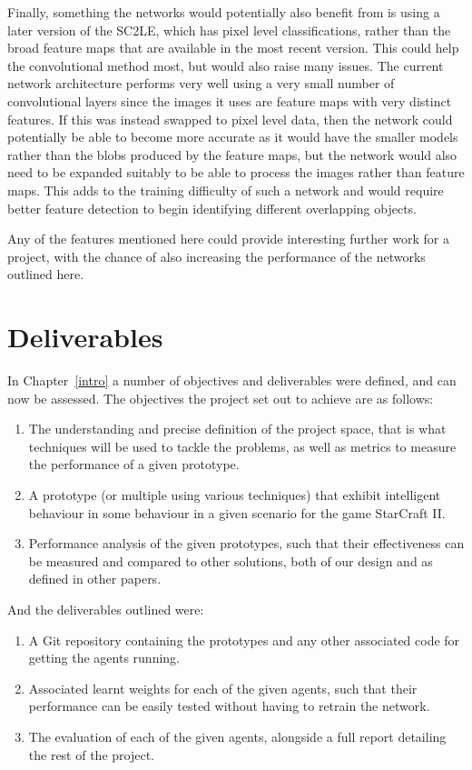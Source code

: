 Finally, something the networks would potentially also benefit from is using a
later version of the SC2LE, which has pixel level classifications, rather than
the broad feature maps that are available in the most recent version. This could
help the convolutional method most, but would also raise many issues. The
current network architecture performs very well using a very small number of
convolutional layers since the images it uses are feature maps with very
distinct features. If this was instead swapped to pixel level data, then the
network could potentially be able to become more accurate as it would have the
smaller models rather than the blobs produced by the feature maps, but the
network would also need to be expanded suitably to be able to process the images
rather than feature maps. This adds to the training difficulty of such a network
and would require better feature detection to begin identifying different
overlapping objects.

Any of the features mentioned here could provide interesting further work for
a project, with the chance of also increasing the performance of the networks
outlined here.

\section{Deliverables}

In Chapter~\ref{intro} a number of objectives and deliverables were defined, and
can now be assessed. The objectives the project set out to achieve are as
follows:

\begin{enumerate}
    \item The understanding and precise definition of the project space, that is
        what techniques will be used to tackle the problems, as well as metrics
        to measure the performance of a given prototype.
    \item A prototype (or multiple using various techniques) that exhibit
        intelligent behaviour in some behaviour in a given scenario for
        the game StarCraft II\@.
    \item Performance analysis of the given prototypes, such that their
        effectiveness can be measured and compared to other solutions, both of
        our design and as defined in other papers.
\end{enumerate}

And the deliverables outlined were:

\begin{enumerate}
    \item A Git repository containing the prototypes and any other associated
        code for getting the agents running.
    \item Associated learnt weights for each of the given agents, such that
        their performance can be easily tested without having to retrain
        the network.
    \item The evaluation of each of the given agents, alongside a full report
        detailing the rest of the project.
\end{enumerate}

